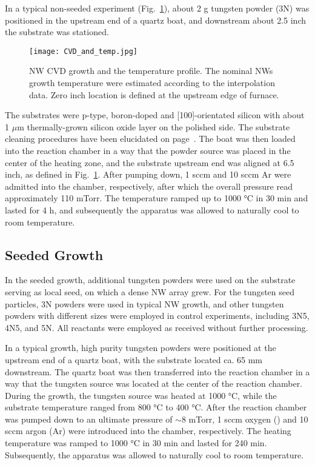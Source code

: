 In a typical non-seeded experiment (Fig.~\ref{fig:wogrow}), about 2 g tungsten powder (3N) was positioned in the upstream end of a quartz boat, and downstream about 2.5 inch the substrate was stationed. 
\begin{figure}[htb]
\centering
\texttt{[image: CVD\_and\_temp.jpg]}
\caption[ NW CVD growth]{ NW CVD growth and the temperature profile. The nominal NWs growth temperature were estimated according to the interpolation data. Zero inch location is defined at the upstream edge of furnace.}
\label{fig:wogrow}
\end{figure}
The substrates were p-type, boron-doped and [100]-orientated silicon with about 1 $\mu$m thermally-grown silicon oxide layer on the polished side. The substrate cleaning procedures have been elucidated on page~\pageref{ch2sub}. The boat was then loaded into the reaction chamber in a way that the powder source was placed in the center of the heating zone, and the substrate upstream end was aligned at 6.5 inch, as defined in Fig.~\ref{fig:wogrow}. After pumping down, 1 \gls{sccm}  and 10 sccm Ar were admitted into the chamber, respectively, after which the overall pressure read approximately 110 mTorr. The temperature ramped up to 1000 \si{\degreeCelsius} in 30 min and lasted for 4 h, and subsequently the apparatus was allowed to naturally cool to room temperature.

\subsection{Seeded Growth}
In the seeded growth, additional tungsten powders were used on the substrate serving as local seed, on which a dense  NW array grew. For the tungsten seed particles, 3N powders were used in typical NW growth, and other tungsten powders with different sizes were employed in control experiments, including 3N5, 4N5, and 5N. All reactants were employed as received without further processing.
 
In a typical growth, high purity tungsten powders were positioned at the upstream end of a quartz boat, with the substrate located ca. 65 mm downstream. The quartz boat was then transferred into the reaction chamber in a way that the tungsten source was located at the center of the reaction chamber. During the growth, the tungsten source was heated at 1000 \si{\degreeCelsius}, while the substrate temperature ranged from 800 \si{\degreeCelsius} to 400 \si{\degreeCelsius}. After the reaction chamber was pumped down to an ultimate pressure of $\sim8$ mTorr, 1 sccm oxygen () and 10 sccm argon (Ar) were introduced into the chamber, respectively. The heating temperature was ramped to 1000 \si{\degreeCelsius} in 30 min and lasted for 240 min. Subsequently, the apparatus was allowed to naturally cool to room temperature. 

